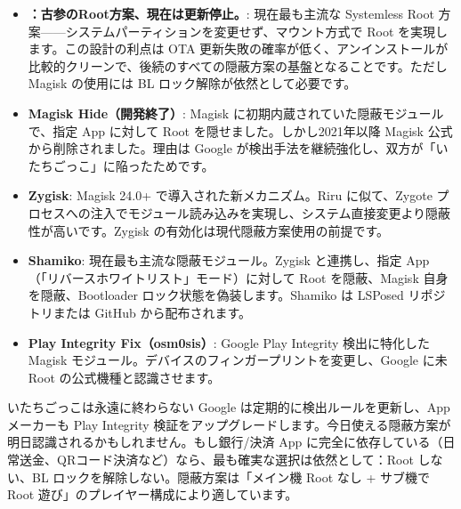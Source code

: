 \begin{itemize}
  \item \textbf{：古参のRoot方案、現在は更新停止。}: 現在最も主流な Systemless Root 方案——システムパーティションを変更せず、マウント方式で Root を実現します。この設計の利点は OTA 更新失敗の確率が低く、アンインストールが比較的クリーンで、後続のすべての隠蔽方案の基盤となることです。ただし Magisk の使用には BL ロック解除が依然として必要です。
  \item \textbf{Magisk Hide（開発終了）}: Magisk に初期内蔵されていた隠蔽モジュールで、指定 App に対して Root を隠せました。しかし2021年以降 Magisk 公式から削除されました。理由は Google が検出手法を継続強化し、双方が「いたちごっこ」に陥ったためです。
  \item \textbf{Zygisk}: Magisk 24.0+ で導入された新メカニズム。Riru に似て、Zygote プロセスへの注入でモジュール読み込みを実現し、システム直接変更より隠蔽性が高いです。Zygisk の有効化は現代隠蔽方案使用の前提です。
  \item \textbf{Shamiko}: 現在最も主流な隠蔽モジュール。Zygisk と連携し、指定 App（「リバースホワイトリスト」モード）に対して Root を隠蔽、Magisk 自身を隠蔽、Bootloader ロック状態を偽装します。Shamiko は LSPosed リポジトリまたは GitHub から配布されます。
  \item \textbf{Play Integrity Fix（osm0sis）}: Google Play Integrity 検出に特化した Magisk モジュール。デバイスのフィンガープリントを変更し、Google に未 Root の公式機種と認識させます。
\end{itemize}

\begin{tcbwarn}{いたちごっこは永遠に終わらない}
Google は定期的に検出ルールを更新し、App メーカーも Play Integrity 検証をアップグレードします。今日使える隠蔽方案が明日認識されるかもしれません。もし銀行/決済 App に完全に依存している（日常送金、QRコード決済など）なら、最も確実な選択は依然として：Root しない、BL ロックを解除しない。隠蔽方案は「メイン機 Root なし + サブ機で Root 遊び」のプレイヤー構成により適しています。

\end{tcbwarn}


